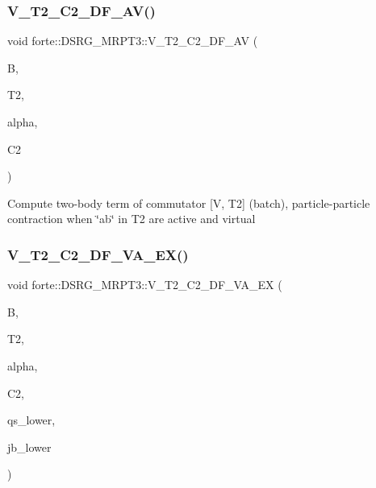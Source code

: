 \subsubsection{\texorpdfstring{V\+\_\+\+T2\+\_\+\+C2\+\_\+\+D\+F\+\_\+\+A\+V()}{V\_T2\_C2\_DF\_AV()}}
{\footnotesize\ttfamily void forte\+::\+D\+S\+R\+G\+\_\+\+M\+R\+P\+T3\+::\+V\+\_\+\+T2\+\_\+\+C2\+\_\+\+D\+F\+\_\+\+AV (\begin{DoxyParamCaption}\item[{Blocked\+Tensor \&}]{B,  }\item[{Blocked\+Tensor \&}]{T2,  }\item[{const double \&}]{alpha,  }\item[{Blocked\+Tensor \&}]{C2 }\end{DoxyParamCaption})\hspace{0.3cm}{\ttfamily [protected]}}

Compute two-\/body term of commutator \mbox{[}V, T2\mbox{]} (batch), particle-\/particle contraction when \char`\"{}ab\char`\"{} in T2 are active and virtual \mbox{\label{classforte_1_1_d_s_r_g___m_r_p_t3_a3484a8491033f0e2171936ba0da11f38}} 
\subsubsection{\texorpdfstring{V\+\_\+\+T2\+\_\+\+C2\+\_\+\+D\+F\+\_\+\+V\+A\+\_\+\+E\+X()}{V\_T2\_C2\_DF\_VA\_EX()}}
{\footnotesize\ttfamily void forte\+::\+D\+S\+R\+G\+\_\+\+M\+R\+P\+T3\+::\+V\+\_\+\+T2\+\_\+\+C2\+\_\+\+D\+F\+\_\+\+V\+A\+\_\+\+EX (\begin{DoxyParamCaption}\item[{Blocked\+Tensor \&}]{B,  }\item[{Blocked\+Tensor \&}]{T2,  }\item[{const double \&}]{alpha,  }\item[{Blocked\+Tensor \&}]{C2,  }\item[{const std\+::vector$<$ std\+::string $>$ \&}]{qs\+\_\+lower,  }\item[{const std\+::vector$<$ std\+::string $>$ \&}]{jb\+\_\+lower }\end{DoxyParamCaption})\hspace{0.3cm}{\ttfamily [protected]}}

